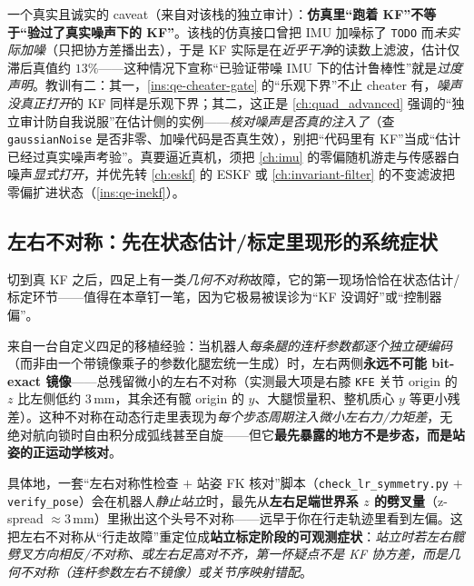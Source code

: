 \begin{pitfall}\label{pit:qe-clean-kf}
一个真实且诚实的 caveat（来自对该栈的独立审计）：\textbf{仿真里“跑着 KF”不等于“验过了真实噪声下的 KF”}。该栈的仿真接口曾把 IMU 加噪标了 \texttt{TODO} 而\emph{未实际加噪}（只把协方差播出去），于是 KF 实际是在\emph{近乎干净}的读数上滤波，估计仅滞后真值约 $13\%$——这种情况下宣称“已验证带噪 IMU 下的估计鲁棒性”就是\emph{过度声明}。教训有二：其一，\cref{ins:qe-cheater-gate} 的“乐观下界”不止 cheater 有，\emph{噪声没真正打开}的 KF 同样是乐观下界；其二，这正是 \cref{ch:quad_advanced} 强调的“独立审计防自我说服”在估计侧的实例——\emph{核对噪声是否真的注入了}（查 \texttt{gaussianNoise} 是否非零、加噪代码是否真生效），别把“代码里有 KF”当成“估计已经过真实噪声考验”。真要逼近真机，须把 \cref{ch:imu} 的零偏随机游走与传感器白噪声\emph{显式打开}，并优先转 \cref{ch:eskf} 的 ESKF 或 \cref{ch:invariant-filter} 的不变滤波把零偏扩进状态（\cref{ins:qe-inekf}）。
\end{pitfall}

\subsection{左右不对称：先在状态估计/标定里现形的系统症状}
\label{subsec:qe-lr-asymmetry}

切到真 KF 之后，四足上有一类\emph{几何不对称}故障，它的第一现场恰恰在状态估计/标定环节——值得在本章钉一笔，因为它极易被误诊为“KF 没调好”或“控制器偏”。

\begin{insight}\label{ins:qe-lr-asymmetry}
来自一台自定义四足的移植经验：当机器人\emph{每条腿的连杆参数都逐个独立硬编码}（而非由一个带镜像乘子的参数化腿宏统一生成）时，左右两侧\textbf{永远不可能 bit-exact 镜像}——总残留微小的左右不对称（实测最大项是右膝 \texttt{KFE} 关节 origin 的 $z$ 比左侧低约 $3\,\mathrm{mm}$，其余还有髋 origin 的 $y$、大腿惯量积、整机质心 $y$ 等更小残差）。这种不对称在动态行走里表现为\emph{每个步态周期注入微小左右力/力矩差}，无绝对航向锁时自由积分成弧线甚至自旋——但它\textbf{最先暴露的地方不是步态，而是站姿的正运动学核对}。

具体地，一套“左右对称性检查 $+$ 站姿 FK 核对”脚本（\texttt{check\_lr\_symmetry.py} $+$ \texttt{verify\_pose}）会在机器人\emph{静止站立}时，最先从\textbf{左右足端世界系 $z$ 的劈叉量}（z-spread $\approx3\,\mathrm{mm}$）里揪出这个头号不对称——远早于你在行走轨迹里看到左偏。这把左右不对称从“行走故障”重定位成\textbf{站立标定阶段的可观测症状}：\emph{站立时若左右髋劈叉方向相反/不对称、或左右足高对不齐，第一怀疑点不是 KF 协方差，而是几何不对称（连杆参数左右不镜像）或关节序映射错配}。
\end{insight}

